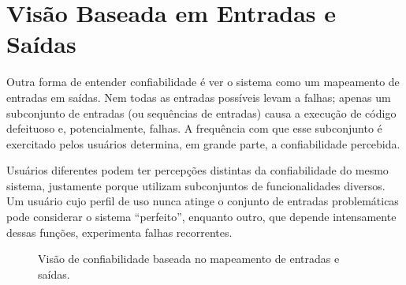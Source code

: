 \documentclass[12pt,a4paper]{report}
\begin{document}
\section{Visão Baseada em Entradas e Saídas}

Outra forma de entender confiabilidade é ver o sistema como um mapeamento de
entradas em saídas. Nem todas as entradas possíveis levam a falhas; apenas
um subconjunto de entradas (ou sequências de entradas) causa a execução de
código defeituoso e, potencialmente, falhas. A frequência com que esse
subconjunto é exercitado pelos usuários determina, em grande parte, a
confiabilidade percebida.

Usuários diferentes podem ter percepções distintas da confiabilidade do
mesmo sistema, justamente porque utilizam subconjuntos de funcionalidades
diversos. Um usuário cujo perfil de uso nunca atinge o conjunto de entradas
problemáticas pode considerar o sistema ``perfeito'', enquanto outro, que
depende intensamente dessas funções, experimenta falhas recorrentes.

\begin{figure}[h]
    \centering
    \caption{Visão de confiabilidade baseada no mapeamento de entradas e saídas.}
\end{figure}
\end{document}
